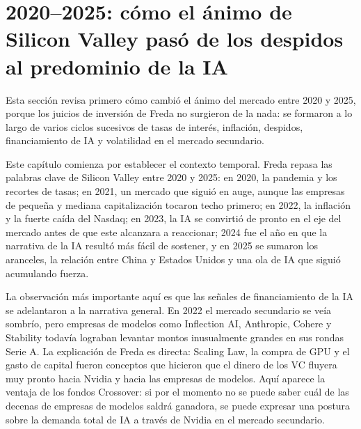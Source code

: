 \section{2020--2025: cómo el ánimo de Silicon Valley pasó de los despidos al predominio de la IA}

Esta sección revisa primero cómo cambió el ánimo del mercado entre 2020 y 2025, porque los juicios de inversión de Freda no surgieron de la nada: se formaron a lo largo de varios ciclos sucesivos de tasas de interés, inflación, despidos, financiamiento de IA y volatilidad en el mercado secundario.

Este capítulo comienza por establecer el contexto temporal. Freda repasa las palabras clave de Silicon Valley entre 2020 y 2025: en 2020, la pandemia y los recortes de tasas; en 2021, un mercado que siguió en auge, aunque las empresas de pequeña y mediana capitalización tocaron techo primero; en 2022, la inflación y la fuerte caída del Nasdaq; en 2023, la IA se convirtió de pronto en el eje del mercado antes de que este alcanzara a reaccionar; 2024 fue el año en que la narrativa de la IA resultó más fácil de sostener, y en 2025 se sumaron los aranceles, la relación entre China y Estados Unidos y una ola de IA que siguió acumulando fuerza.

La observación más importante aquí es que las señales de financiamiento de la IA se adelantaron a la narrativa general. En 2022 el mercado secundario se veía sombrío, pero empresas de modelos como Inflection AI, Anthropic, Cohere y Stability todavía lograban levantar montos inusualmente grandes en sus rondas Serie A. La explicación de Freda es directa: Scaling Law, la compra de GPU y el gasto de capital fueron conceptos que hicieron que el dinero de los VC fluyera muy pronto hacia Nvidia y hacia las empresas de modelos. Aquí aparece la ventaja de los fondos Crossover: si por el momento no se puede saber cuál de las decenas de empresas de modelos saldrá ganadora, se puede expresar una postura sobre la demanda total de IA a través de Nvidia en el mercado secundario.

